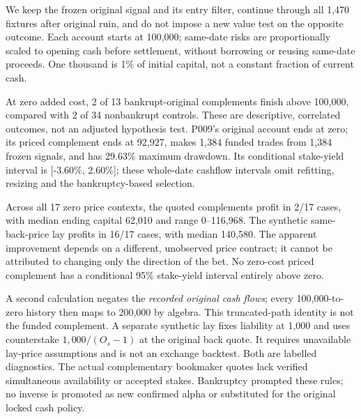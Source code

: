 \documentclass[11pt,letterpaper]{article}
\newcommand{\resulttable}[3]{\begin{table}[htbp]\centering\small\caption{#1}\label{#2}\end{table}}
\begin{document}
We keep the frozen original signal and its entry filter, continue through
all 1,470 fixtures after original ruin, and do not impose a new value test
on the opposite outcome. Each account starts at 100,000; same-date risks
are proportionally scaled to opening cash before settlement, without
borrowing or reusing same-date proceeds. One thousand is 1\% of initial
capital, not a constant fraction of current cash.

\resulttable{Full-horizon EPL opposite policies from 100,000, main cohort
only. ``Profit'' counts ending balances above 100,000. Costs haircut each
fixture's positive net profit by 0\%, 2\% or 5\%; they are scenarios, not
observed venue commissions.}{tab:epl_inverse_controls}{epl_inverse_controls.tex}

At zero added cost, 2 of 13 bankrupt-original complements finish above 100,000, compared with 2 of 34 nonbankrupt controls. These are descriptive, correlated outcomes, not an adjusted hypothesis test. P009's original account ends at zero; its priced complement ends at 92,927, makes 1,384 funded trades from 1,384 frozen signals, and has 29.63\% maximum drawdown. Its conditional stake-yield interval is [-3.60\%, 2.60\%]; these whole-date cashflow intervals omit refitting, resizing and the bankruptcy-based selection.

Across all 17 zero price contexts, the quoted complements profit in 2/17 cases, with median ending capital 62,010 and range 0--116,968. The synthetic same-back-price lay profits in 16/17 cases, with median 140,580. The apparent improvement depends on a different, unobserved price contract; it cannot be attributed to changing only the direction of the bet. No zero-cost priced complement has a conditional 95\% stake-yield interval entirely above zero.


A second calculation negates the \emph{recorded original cash flows}; every
100,000-to-zero history then maps to 200,000 by algebra. This truncated-path
identity is not the funded complement. A separate synthetic lay fixes
liability at 1,000 and uses counterstake $1,000/(O_s-1)$ at the original
back quote. It requires unavailable lay-price assumptions and is not an
exchange backtest. Both are labelled diagnostics. The actual complementary
bookmaker quotes lack verified simultaneous availability or accepted stakes.
Bankruptcy prompted these rules; no inverse is promoted as new confirmed
alpha or substituted for the original locked cash policy.
\end{document}
